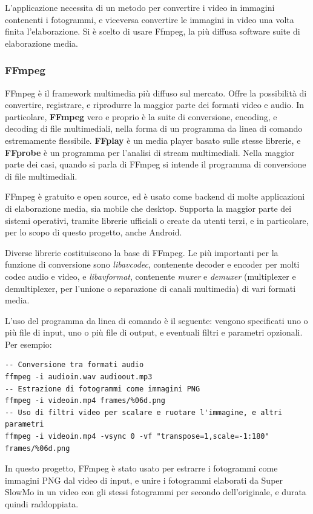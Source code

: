L'applicazione necessita di un metodo per convertire i video in immagini contenenti i
fotogrammi, e viceversa convertire le immagini in video una volta finita l'elaborazione.
Si è scelto di usare Ffmpeg, la più diffusa software suite di elaborazione media.

\subsubsection*{FFmpeg}

FFmpeg è il framework multimedia più diffuso sul mercato. Offre la possibilità di convertire, 
registrare, e riprodurre la maggior parte dei formati video e audio. In particolare, 
\textbf{FFmpeg} vero e proprio è la suite di conversione, encoding, e decoding di file
multimediali, nella forma di un programma da linea di comando estremamente flessibile.
\textbf{FFplay} è un media player basato sulle stesse librerie, e \textbf{FFprobe} è un
programma per l'analisi di stream multimediali. Nella maggior parte dei casi, quando si
parla di FFmpeg si intende il programma di conversione di file multimediali.

FFmpeg è gratuito e open source, ed è usato come backend di molte applicazioni di elaborazione
media, sia mobile che desktop. Supporta la maggior parte dei sistemi operativi, tramite librerie
ufficiali o create da utenti terzi, e in particolare, per lo scopo di questo progetto, anche
Android. 

Diverse librerie costituiscono la base di FFmpeg. Le più importanti per la funzione di
conversione sono \emph{libavcodec}, contenente decoder e encoder per molti codec audio e video, 
e \emph{libavformat}, contenente \emph{muxer} e \emph{demuxer} (multiplexer e demultiplexer, 
per l'unione o separazione di canali multimedia) di vari formati media.

L'uso del programma da linea di comando è il seguente: vengono specificati uno o più file di 
input, uno o più file di output, e eventuali filtri e parametri opzionali. Per esempio:

\begin{verbatim}
-- Conversione tra formati audio
ffmpeg -i audioin.wav audioout.mp3
-- Estrazione di fotogrammi come immagini PNG
ffmpeg -i videoin.mp4 frames/%06d.png
-- Uso di filtri video per scalare e ruotare l'immagine, e altri parametri
ffmpeg -i videoin.mp4 -vsync 0 -vf "transpose=1,scale=-1:180" frames/%06d.png
\end{verbatim}

In questo progetto, FFmpeg è stato usato per estrarre i fotogrammi come immagini PNG dal video
di input, e unire i fotogrammi elaborati da Super SlowMo in un video con gli stessi fotogrammi
per secondo dell'originale, e durata quindi raddoppiata.

